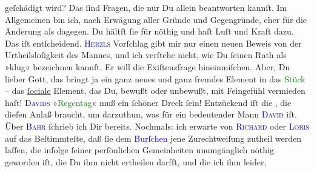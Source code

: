                    geſchädigt wird? Das ſind Fragen, die nur Du allein beantworten kannſt. Im
               Allgemeinen bin ich, nach Erwägung aller Gründe und Gegengründe, eher {\pb}für die Änderung als dagegen. Du hältſt ſie für
               nöthig und haſt Luſt und Kraft dazu. Das iſt entſcheidend.\pend
           \pstart
           \textsc{\textcolor{blue}{Herzl}{}\ledrightnote{\textcolor{blue}{Theodor Herzl}}s} Vorſchlag gibt mir nur einen
               neuen Beweis von der Urtheilsloſigkeit des Mannes, und ich verſtehe nicht, wie Du
               ſeinen Rath als »klug« bezeichnen kannſt. Er will die Exiſtenzfrage hineinmiſchen.
               Aber, Du lieber Gott, das bringt ja ein {\pb}ganz neues
               und ganz fremdes Element in das \textcolor{green}{Stück}{} – das \uline{ſociale} Element, das Du, bewußt
               oder unbewußt, mit Feingefühl vermieden haſt!{\dotsfour}\pend
           \pstart
           \textsc{\textcolor{blue}{David}{}\ledrightnote{\textcolor{blue}{Jakob Julius David}}s} »\textcolor{green}{Regentag}{}\ledrightnote{\textcolor{green}{Ein Regentag}}« muß ein ſchöner Dreck ſein! Entzückend iſt die \label{K_L02753-3v}\label{K_L02753-3h}, die dieſen Anlaß braucht, {\pb}um darzuthun, was für ein bedeutender Mann \textsc{\textcolor{blue}{David}{}\ledrightnote{\textcolor{blue}{Jakob Julius David}}} iſt.\pend
           \pstart
           Über \textsc{\textcolor{blue}{Bahr}{}\ledrightnote{\textcolor{blue}{Hermann Bahr}}} ſchrieb ich Dir bereits. Nochmals: ich erwarte von \textcolor{blue}{\textsc{Richard}}{}\ledrightnote{\textcolor{blue}{Richard Beer-Hofmann}} oder \textsc{\textcolor{blue}{Loris}{}\ledrightnote{\textcolor{blue}{Hugo von Hofmannsthal}}} auf das Beſtimmteſte, daß ſie dem \textcolor{blue}{Burſchen}{} jene Zurechtweiſung zutheil werden laſſen, die
               infolge ſeiner perſönlichen Gemeinheiten unumgänglich nöthig geworden iſt, die Du ihm
               nicht ertheilen darfſt, und {\pb}die ich ihm leider,
